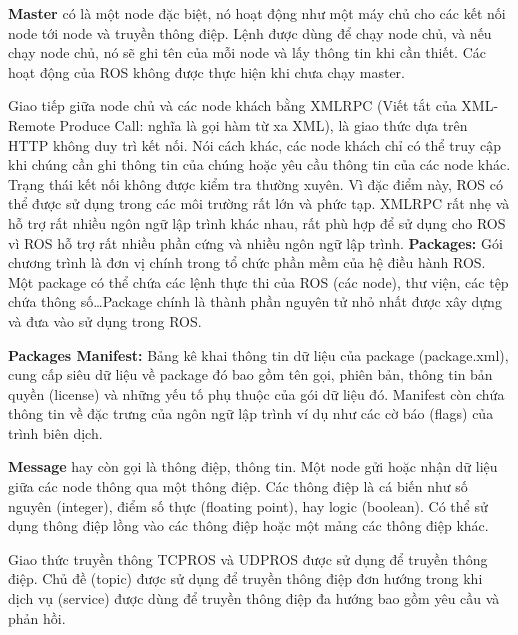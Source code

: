 \textbf{Master} có là một node đặc biệt, nó hoạt động như một máy chủ cho các kết nối node tới node và truyền thông điệp. Lệnh  được dùng để chạy node chủ, và nếu chạy node chủ, nó sẽ ghi tên của mỗi node và lấy thông tin khi cần thiết. Các hoạt động của ROS không được thực hiện khi chưa chạy master.

Giao tiếp giữa node chủ và các node khách bằng XMLRPC (Viết tắt của XML-Remote Produce Call: nghĩa là gọi hàm từ xa XML), là giao thức dựa trên HTTP không duy trì kết nối. Nói cách khác, các node khách chỉ có thể truy cập khi chúng cần ghi thông tin của chúng hoặc yêu cầu thông tin của các node khác. Trạng thái kết nối không được kiểm tra thường xuyên. Vì đặc điểm này, ROS có thể được sử dụng trong các môi trường rất lớn và phức tạp. XMLRPC rất nhẹ và hỗ trợ rất nhiều ngôn ngữ lập trình khác nhau, rất phù hợp để sử dụng cho ROS vì ROS hỗ trợ rất nhiều phần cứng và nhiều ngôn ngữ lập trình.
\textbf{Packages:} Gói chương trình là đơn vị chính trong tổ chức phần mềm của hệ điều hành ROS. Một package có thể chứa các lệnh thực thi của ROS (các node), thư viện, các tệp chứa thông số\dots Package chính là thành phần nguyên tử nhỏ nhất được xây dựng và đưa vào sử dụng trong ROS.

\textbf{Packages Manifest:} Bảng kê khai thông tin dữ liệu của package (package.xml), cung cấp siêu dữ liệu về package đó bao gồm tên gọi, phiên bản, thông tin bản quyền (license) và những yếu tố phụ thuộc của gói dữ liệu đó. Manifest còn chứa thông tin về đặc trưng của ngôn ngữ lập trình ví dụ như các cờ báo (flags) của trình biên dịch.

\textbf{Message} hay còn gọi là thông điệp, thông tin. Một node gửi hoặc nhận dữ liệu giữa các node thông qua một thông điệp. Các thông điệp là cá biến như số nguyên (integer), điểm số thực (floating point), hay logic (boolean). Có thể sử dụng thông điệp lồng vào các thông điệp hoặc một mảng các thông điệp khác.

Giao thức truyền thông TCPROS và UDPROS được sử dụng để truyền thông điệp. Chủ đề (topic) được sử dụng để truyền thông điệp đơn hướng trong khi dịch vụ (service) được dùng để truyền thông điệp đa hướng bao gồm yêu cầu và phản hồi.

